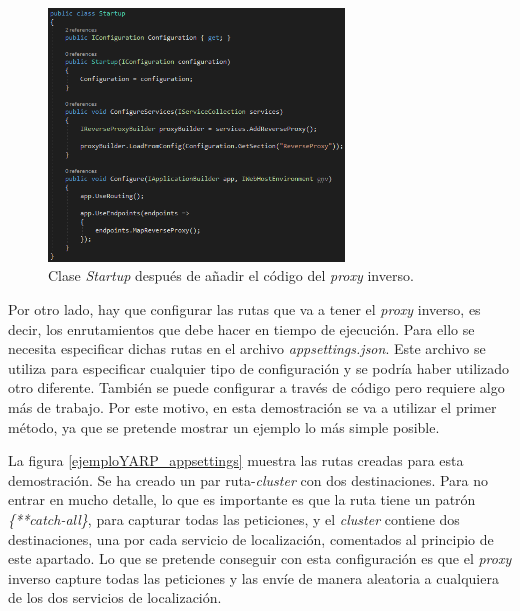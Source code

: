 \documentclass[11pt,spanish,listoffigures]{tfgetsinf}
\begin{document}
\begin{figure}[ht]
\centering
\includegraphics[width=0.7\textwidth]{imagenes/ejemploYARP/startup}
\caption{Clase \emph{Startup} después de añadir el código del \emph{proxy} inverso.}
	\label{ejemploYARP_startup}
\end{figure}

Por otro lado, hay que configurar las rutas que va a tener el \emph{proxy} inverso, es decir, los enrutamientos que debe hacer en tiempo de ejecución. Para ello se necesita especificar dichas rutas en el archivo \emph{appsettings.json}. Este archivo se utiliza para especificar cualquier tipo de configuración y se podría haber utilizado otro diferente. También se puede configurar a través de código pero requiere algo más de trabajo. Por este motivo, en esta demostración se va a utilizar el primer método, ya que se pretende mostrar un ejemplo lo más simple posible.

La figura \ref{ejemploYARP_appsettings} muestra las rutas creadas para esta demostración. Se ha creado un par ruta-\emph{cluster} con dos destinaciones. Para no entrar en mucho detalle, lo que es importante es que la ruta tiene un patrón \emph{\{**catch-all\}}, para capturar todas las peticiones, y el \emph{cluster} contiene dos destinaciones, una por cada servicio de localización, comentados al principio de este apartado. Lo que se pretende conseguir con esta configuración es que el \emph{proxy} inverso capture todas las peticiones y las envíe de manera aleatoria a cualquiera de los dos servicios de localización.
\end{document}
